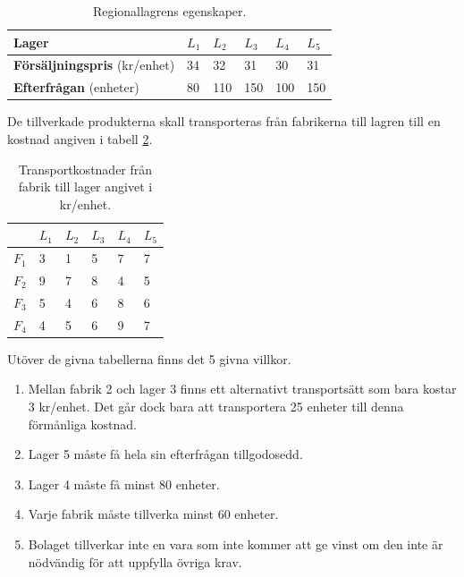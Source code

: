 \documentclass[titlepage, a4paper]{article}
\begin{document}
\begin{table}[h!]
    \centering
    \begin{tabular}{ | l | l | l | l | l | l | }
        \hline
        {\textbf{Lager}} & {$L_{1}$} & {$L_{2}$} & {$L_{3}$} & {$L_{4}$} & {$L_{5}$} \\\hline
        {\textbf{Försäljningspris} (kr/enhet)} & {34} & {32} & {31} & {30} & {31} \\\hline
        {\textbf{Efterfrågan} (enheter)} & {80} & {110} & {150} & {100} & {150} \\\hline
    \end{tabular}
    \caption{Regionallagrens egenskaper.} \label{lager-egenskaper}
\end{table}

De tillverkade produkterna skall transporteras från fabrikerna till lagren till en kostnad angiven i tabell \ref{transportkostnader}.

\begin{table}[h!]
    \centering
    \begin{tabular}{ | l | l | l | l | l | l | }
        \hline
        {} & {$L_{1}$} & {$L_{2}$} & {$L_{3}$} & {$L_{4}$} & {$L_{5}$} \\\hline
        {$F_{1}$} & {3} & {1} & {5} & {7} & {7} \\\hline
        {$F_{2}$} & {9} & {7} & {8} & {4} & {5} \\\hline
        {$F_{3}$} & {5} & {4} & {6} & {8} & {6} \\\hline
        {$F_{4}$} & {4} & {5} & {6} & {9} & {7} \\\hline
    \end{tabular}
    \caption{Transportkostnader från fabrik till lager angivet i kr/enhet.} \label{transportkostnader}
\end{table}

Utöver de givna tabellerna finns det 5 givna villkor.

\begin{enumerate}
\item{Mellan fabrik 2 och lager 3 finns ett alternativt transportsätt som bara kostar 3 kr/enhet. Det går dock bara att transportera 25 enheter till denna förmånliga kostnad.} \label{bivillkor1}
\item{Lager 5 måste få hela sin efterfrågan tillgodosedd.} \label{bivillkor2}
\item{Lager 4 måste få minst 80 enheter.} \label{bivillkor3}
\item{Varje fabrik måste tillverka minst 60 enheter.} \label{bivillkor4}
\item{Bolaget tillverkar inte en vara som inte kommer att ge vinst om den inte är nödvändig för att uppfylla övriga krav.} \label{bivillkor5}
\end{enumerate}
\end{document}
